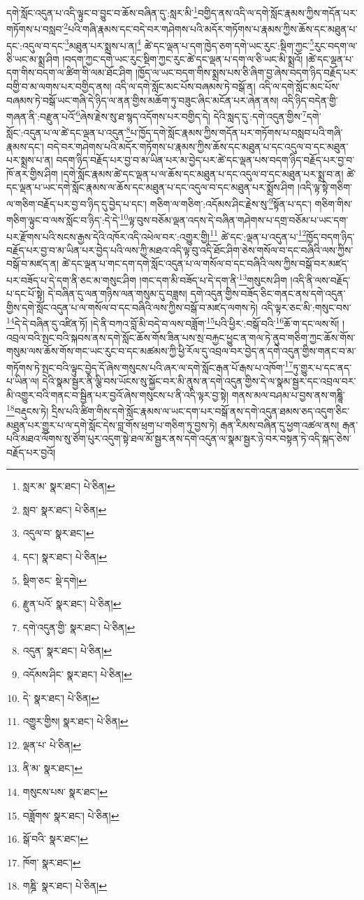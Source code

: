དགེ་སློང་འདུན་པ་འདི་ལྟུང་བ་བྱུང་བ་ཆོས་བཞིན་དུ་:སླར་མི་\footnote{སླར་མ་  སྣར་ཐང་།  པེ་ཅིན། }བགྱིད་ནས་འདི་ལ་དགེ་སློང་རྣམས་ཀྱིས་གདོན་པར་གཏོགས་པ་བསླབ་\footnote{སླབ་  སྣར་ཐང་།  པེ་ཅིན། }པའི་གཞི་རྣམས་དང་བདེ་བར་གཤེགས་པའི་མདོར་གཏོགས་པ་རྣམས་ཀྱིས་ཆོས་དང་མཐུན་པ་དང་:འདུལ་བ་དང་\footnote{འདུལ་བ་  སྣར་ཐང་། }མཐུན་པར་སྨྲས་པ་ན།\footnote{དང་།  སྣར་ཐང་།  པེ་ཅིན། } ཚེ་དང་ལྡན་པ་དག་ཁྱེད་ཅག་དགེ་ཡང་རུང་:སྡིག་ཀྱང་\footnote{སྡིག་ཅང་  སྡེ་དགེ། }རུང་བདག་ལ་ཅི་ཡང་མ་སྨྲ་ཤིག །བདག་ཀྱང་དགེ་ཡང་རུང་སྡིག་ཀྱང་རུང་ཚེ་དང་ལྡན་པ་དག་ལ་ཅི་ཡང་མི་སྨྲའོ། །ཚེ་དང་ལྡན་པ་དག་གིས་བདག་ལ་ཚིག་གི་ལམ་ཐོང་ཤིག །ཁྱོད་ལ་ཡང་བདག་གིས་སྨྲས་པས་ཅི་ཞིག་བྱ་ཞེས་བདག་ཉིད་བརྗོད་པར་བགྱི་བ་མ་ལགས་པར་བགྱིད་ནས། འདི་ལ་དགེ་སློང་མང་པོས་བཞམས་ཏེ་བསྒོ་ན། འདི་ལ་དགེ་སློང་མང་པོས་བཞམས་ཏེ་བསྒོ་ཡང་གཞི་དེ་ཉིད་ལ་ནན་གྱིས་མཆོག་ཏུ་བཟུང་ཞིང་མངོན་པར་ཞེན་ནས། འདི་ཉིད་བདེན་གྱི་གཞན་ནི་:བརྫུན་པའོ་\footnote{རྫུན་པའོ་  སྣར་ཐང་།  པེ་ཅིན། }ཞེས་རྗེས་སུ་ཐ་སྙད་འདོགས་པར་བགྱིད་དེ། དེའི་སླད་དུ་:དགེ་འདུན་གྱིས་\footnote{དགེ་འདུན་གྱི་  སྣར་ཐང་།  པེ་ཅིན། }དགེ་སློང་:འདུན་པ་ལ་ཚེ་དང་ལྡན་པ་འདུན་\footnote{འདུན་  སྣར་ཐང་།  པེ་ཅིན། }པ་ཁྱོད་དགེ་སློང་རྣམས་ཀྱིས་གདོན་པར་གཏོགས་པ་བསླབ་པའི་གཞི་རྣམས་དང་། བདེ་བར་གཤེགས་པའི་མདོར་གཏོགས་པ་རྣམས་ཀྱིས་ཆོས་དང་མཐུན་པ་དང་འདུལ་བ་དང་མཐུན་པར་སྨྲས་པ་ན། བདག་ཉིད་བརྗོད་པར་བྱ་བ་མ་ཡིན་པར་མ་བྱེད་པར་ཚེ་དང་ལྡན་པས་བདག་ཉིད་བརྗོད་པར་བྱ་བ་ཁོ་ནར་གྱིས་ཤིག །དགེ་སློང་རྣམས་ཚེ་དང་ལྡན་པ་ལ་ཆོས་དང་མཐུན་པ་དང་འདུལ་བ་དང་མཐུན་པར་སྨྲ་བ་ན། ཚེ་དང་ལྡན་པ་ཡང་དགེ་སློང་རྣམས་ལ་ཆོས་དང་མཐུན་པ་དང་འདུལ་བ་དང་མཐུན་པར་སྨྲོས་ཤིག །འདི་ལྟ་སྟེ་གཅིག་ལ་གཅིག་བརྗོད་པར་བྱ་བ་ཉིད་དུ་བྱེད་པ་དང་། གཅིག་ལ་གཅིག་:འདོམས་ཤིང་རྗེས་སུ་\footnote{འདོམས་ཤིང་  སྣར་ཐང་།  པེ་ཅིན། }སྟོན་པ་དང་། གཅིག་གིས་གཅིག་ལྟུང་བ་ལས་སློང་བ་ཉིད་:དེ་དེ་\footnote{དེ་  སྣར་ཐང་།  པེ་ཅིན། }ལྟ་བུས་བཅོམ་ལྡན་འདས་དེ་བཞིན་གཤེགས་པ་དགྲ་བཅོམ་པ་ཡང་དག་པར་རྫོགས་པའི་སངས་རྒྱས་དེའི་འཁོར་འདི་འཕེལ་བར་:འགྱུར་གྱི།\footnote{འགྱུར་གྱིས།  སྣར་ཐང་།  པེ་ཅིན། } ཚེ་དང་:ལྡན་པ་འདུན་པ་\footnote{ལྡན་པ་  པེ་ཅིན། }ཁྱོད་བདག་ཉིད་བརྗོད་པར་བྱ་བ་མ་ཡིན་པར་བྱེད་པའི་ལས་ཀྱི་མཐའ་འདི་ལྟ་བུ་འདི་ཐོང་ཤིག་ཅེས་གསོལ་བ་དང་བཞིའི་ལས་ཀྱིས་བསྒོ་བ་མཛད་ན། ཚེ་དང་ལྡན་པ་གང་དག་དགེ་སློང་འདུན་པ་ལ་གསོལ་བ་དང་བཞིའི་ལས་ཀྱིས་བསྒོ་བར་མཛད་པར་བཟོད་པ་དེ་དག་ནི་ཅང་མ་གསུང་ཤིག །གང་དག་མི་བཟོད་པ་དེ་དག་ནི་\footnote{ནི་མ་  སྣར་ཐང་། }གསུངས་ཤིག །འདི་ནི་ལས་བརྗོད་པ་དང་པོ་སྟེ། དེ་བཞིན་དུ་ལན་གཉིས་ལན་གསུམ་དུ་བཟླས། དགེ་འདུན་གྱིས་བཟོད་ཅིང་གནང་ནས་དགེ་འདུན་གྱིས་དགེ་སློང་འདུན་པ་ལ་གསོལ་བ་དང་བཞིའི་ལས་ཀྱིས་བསྒོ་བ་མཛད་ལགས་ཏེ། འདི་ལྟར་ཅང་མི་:གསུང་བས་\footnote{གསུངས་པས་  སྣར་ཐང་། }དེ་དེ་བཞིན་དུ་འཛིན་ཏོ། །དེ་ནི་བཀའ་བློ་མི་བདེ་བ་ལས་བཟློག་\footnote{བཟློགས་  སྣར་ཐང་།  པེ་ཅིན། }པའི་ཕྱིར་:བསྒོ་བའི་\footnote{སྒོ་བའི་  སྣར་ཐང་། }ཆོ་ག་དང་ལས་སོ། །འབྲལ་བའི་སྤང་བའི་སྐབས་ནས་དགེ་སློང་ཆོས་གོས་ཟིན་པས་སྲ་བརྐྱང་ཕྱུང་ན་གལ་ཏེ་ནུབ་གཅིག་ཀྱང་ཆོས་གོས་གསུམ་ལས་ཆོས་གོས་གང་ཡང་རུང་བ་དང་མཚམས་ཀྱི་ཕྱི་རོལ་དུ་འབྲལ་བར་བྱེད་ན་དགེ་འདུན་གྱིས་གནང་བ་མ་གཏོགས་ཏེ་སྤང་བའི་ལྟུང་བྱེད་དོ་ཞེས་གསུངས་པའི་ཞར་ལ་དགེ་སློང་རྒན་པོ་རྒས་པ་འཁོག་\footnote{ཁོག་  སྣར་ཐང་། }ཏུ་གྱུར་པ་དང་ནད་པ་ཡིན་ལ། དེའི་སྣམ་སྦྱར་ནི་ལྕི་བས་ཡོངས་སུ་སྐྱོང་བར་མི་ནུས་ན་དགེ་འདུན་གྱིས་དེ་ལ་སྣམ་སྦྱར་དང་འབྲལ་བར་མི་འགྱུར་བའི་གནང་བ་སྦྱིན་པར་བྱའོ་ཞེས་གསུངས་པ་ནི་འདི་ལྟར་བྱ་སྟེ། གནས་མལ་བཤམ་པ་བྱས་ནས་གཎྜཱི་\footnote{གཎྜི་  སྣར་ཐང་།  པེ་ཅིན། }བརྡུངས་ཏེ། དྲིས་པའི་ཚིག་གིས་དགེ་སློང་རྣམས་ལ་ཡང་དག་པར་བསྒོ་ནས་དགེ་འདུན་ཐམས་ཅད་འདུག་ཅིང་མཐུན་པར་གྱུར་པ་ལ་དགེ་སློང་དེས་བླ་གོས་ཕྲག་པ་གཅིག་ཏུ་བྱས་ཏེ། རྒན་རིམས་བཞིན་དུ་ཕྱག་འཚལ་ནས། རྒན་པའི་མཐའ་ལོགས་སུ་ཙོག་པུར་འདུག་སྟེ་ཐལ་མོ་སྦྱར་ནས་དགེ་འདུན་ལ་སྣམ་སྦྱར་ཉེ་བར་བསྟན་ཏེ་འདི་སྐད་ཅེས་བརྗོད་པར་བྱའོ། 